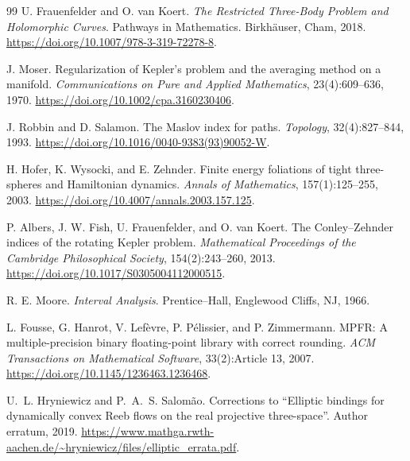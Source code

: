 \documentclass[11pt]{article}
\begin{document}
\begin{thebibliography}{99}
U. Frauenfelder and O. van Koert.
\newblock \emph{The Restricted Three-Body Problem and Holomorphic Curves}.
\newblock Pathways in Mathematics. Birkh\"auser, Cham, 2018.
\newblock \url{https://doi.org/10.1007/978-3-319-72278-8}.

J. Moser.
\newblock Regularization of Kepler's problem and the averaging method on a manifold.
\newblock \emph{Communications on Pure and Applied Mathematics}, 23(4):609--636, 1970.
\newblock \url{https://doi.org/10.1002/cpa.3160230406}.

J. Robbin and D. Salamon.
\newblock The Maslov index for paths.
\newblock \emph{Topology}, 32(4):827--844, 1993.
\newblock \url{https://doi.org/10.1016/0040-9383(93)90052-W}.

H. Hofer, K. Wysocki, and E. Zehnder.
\newblock Finite energy foliations of tight three-spheres and Hamiltonian dynamics.
\newblock \emph{Annals of Mathematics}, 157(1):125--255, 2003.
\newblock \url{https://doi.org/10.4007/annals.2003.157.125}.

P. Albers, J. W. Fish, U. Frauenfelder, and O. van Koert.
\newblock The Conley--Zehnder indices of the rotating Kepler problem.
\newblock \emph{Mathematical Proceedings of the Cambridge Philosophical Society}, 154(2):243--260, 2013.
\newblock \url{https://doi.org/10.1017/S0305004112000515}.

R. E. Moore.
\newblock \emph{Interval Analysis}.
\newblock Prentice--Hall, Englewood Cliffs, NJ, 1966.

L. Fousse, G. Hanrot, V. Lefèvre, P. Pélissier, and P. Zimmermann.
\newblock MPFR: A multiple-precision binary floating-point library with correct rounding.
\newblock \emph{ACM Transactions on Mathematical Software}, 33(2):Article 13, 2007.
\newblock \url{https://doi.org/10.1145/1236463.1236468}.

U.~L. Hryniewicz and P.~A.~S. Salom\~ao.
\newblock Corrections to ``Elliptic bindings for dynamically convex Reeb flows on the real projective three-space''.
\newblock Author erratum, 2019.
\newblock \url{https://www.mathga.rwth-aachen.de/~hryniewicz/files/elliptic_errata.pdf}.

\end{thebibliography}
\end{document}
